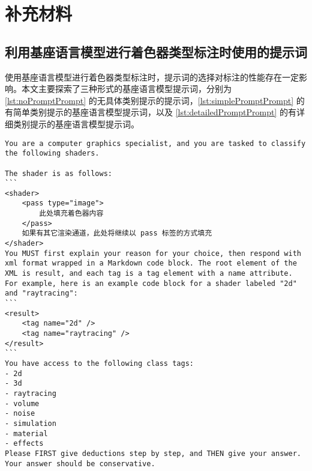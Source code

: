 
\chapter{补充材料}


\section{利用基座语言模型进行着色器类型标注时使用的提示词}
\label{sec:prompt_appendix}

{\added 使用基座语言模型进行着色器类型标注时，提示词的选择对标注的性能存在一定影响。本文主要探索了三种形式的基座语言模型提示词，分别为 \ref{lst:noPromptPrompt} 的无具体类别提示的提示词，\ref{lst:simplePromptPrompt} 的有简单类别提示的基座语言模型提示词，以及 \ref{lst:detailedPromptPrompt} 的有详细类别提示的基座语言模型提示词。}


\begin{lstlisting}[style=plaintext, caption={无类别提示的基座语言模型提示词}, label=lst:noPromptPrompt]
You are a computer graphics specialist, and you are tasked to classify the following shaders.

The shader is as follows:
```
<shader>
    <pass type="image">
        此处填充着色器内容
    </pass>
    如果有其它渲染通道，此处将继续以 pass 标签的方式填充
</shader>
You MUST first explain your reason for your choice, then respond with xml format wrapped in a Markdown code block. The root element of the XML is result, and each tag is a tag element with a name attribute.
For example, here is an example code block for a shader labeled "2d" and "raytracing":
```
<result>
    <tag name="2d" />
    <tag name="raytracing" />
</result>
```
You have access to the following class tags:
- 2d
- 3d
- raytracing
- volume
- noise
- simulation
- material
- effects
Please FIRST give deductions step by step, and THEN give your answer. Your answer should be conservative.
\end{lstlisting}

